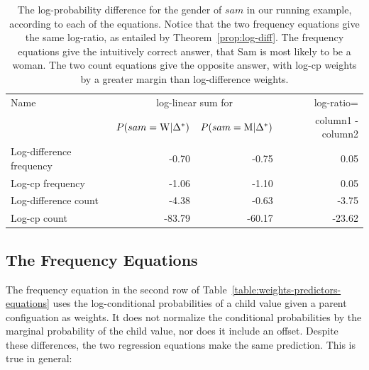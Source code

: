 \documentclass[twoside,11pt]{article}
\begin{document}
\begin{table}[htdp]
\vspace{-1cm}
\caption{The log-probability difference for the gender of $sam$ in our running example, according to each of the equations. Notice that the two frequency equations give the same log-ratio, as entailed by Theorem~\ref{prop:log-diff}. The frequency equations give the intuitively correct answer, that Sam is most likely to be a woman. The two count equations give the opposite answer, with log-cp weights by a greater margin than log-difference weights.}
\begin{center}
\begin{tabular}{|l|r|r|r|}
\hline
Name & \multicolumn{2}{c|}{log-linear sum for} & log-ratio= \\
 & $P(sam = \mathrm{W} | \Delta^{*}\hspace{0.0ex}) $ & $P(sam = \mathrm{M} | \Delta^{*}\hspace{0.0ex}) $ & column1 - column2
 \\ \hline
Log-difference frequency & -0.70 & -0.75 & 0.05 \\
Log-cp frequency & -1.06 & -1.10 & 0.05 \\
Log-difference count & -4.38 & -0.63 & -3.75 \\
Log-cp count & -83.79 & -60.17 & -23.62 \\
\hline
\end{tabular}
\end{center}
\label{table:equation-examples}
\end{table}%


\subsection{The Frequency Equations} The frequency equation in the second row of Table~\ref{table:weights-predictors-equations} uses the log-conditional probabilities of a child value given a parent configuation as weights. It does not normalize the conditional probabilities by the marginal probability of the child value, nor does it include an offset. 
Despite these differences, the two regression equations make the same prediction. This is true in general:
\end{document}
